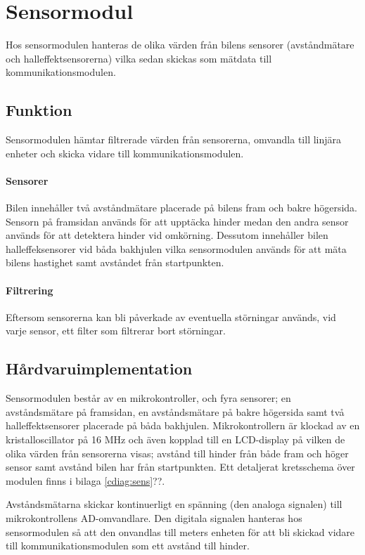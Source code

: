 \documentclass[tekniskrapport/tech.tex]{subfiles}
\begin{document}
\section{Sensormodul}
Hos sensormodulen hanteras de olika värden från bilens sensorer (avståndmätare och halleffektsensorerna) vilka sedan skickas som mätdata till kommunikationsmodulen.

\subsection{Funktion}
Sensormodulen hämtar filtrerade värden från sensorerna, omvandla
till linjära enheter och skicka vidare till kommunikationsmodulen.

\paragraph{Sensorer} Bilen innehåller två avståndmätare placerade på bilens fram och bakre högersida. Sensorn på framsidan används för att upptäcka hinder medan den andra sensor används för att detektera hinder vid omkörning. Dessutom innehåller bilen halleffeksensorer vid båda bakhjulen vilka sensormodulen används för att mäta bilens hastighet samt avståndet från startpunkten. 

\paragraph{Filtrering} Eftersom sensorerna kan bli påverkade av eventuella
störningar används, vid varje sensor, ett filter som filtrerar bort
störningar.

\subsection{Hårdvaruimplementation} Sensormodulen består av en
mikrokontroller, och fyra sensorer; en avståndsmätare på framsidan, en
avståndsmätare på bakre högersida samt två halleffektsensorer placerade på båda bakhjulen. Mikrokontrollern är klockad av en kristalloscillator på 16 MHz och även kopplad till en LCD-display på vilken de olika värden från sensorerna visas; avstånd till hinder från både fram och höger sensor samt avstånd bilen har från startpunkten. Ett detaljerat kretsschema över modulen finns i bilaga
\ref{cdiag:sens}??.

Avståndsmätarna skickar kontinuerligt en spänning (den analoga signalen) till mikrokontrollens AD-omvandlare. Den digitala signalen hanteras hos sensormodulen så att den onvandlas till meters enheten för att bli skickad vidare till kommunikationsmodulen som ett avstånd till hinder.
\end{document}
